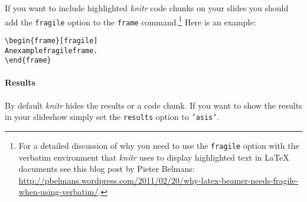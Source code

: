 \noindent If you want to include highlighted {\emph{knitr}} code chunks on your slides you should add the \texttt{fragile} option to the \texttt{frame} command.\footnote{For a detailed discussion of why you need to use the \texttt{fragile} option with the verbatim environment that {\emph{knitr}} uses to display highlighted text in LaTeX documents see this blog post by Pieter Belmans: \url{http://pbelmans.wordpress.com/2011/02/20/why-latex-beamer-needs-fragile-when-using-verbatim/}.} Here is an example:

\begin{knitrout}
\color{fgcolor}\begin{kframe}
\begin{alltt}
\textbackslash{}begin\{frame\}[fragile]
    An example fragile frame.
\textbackslash{}end\{frame\}
\end{alltt}
\end{kframe}
\end{knitrout}


\paragraph{Results}

By default {\emph{knitr}} hides the results or a code chunk. If you want to show the results in your slideshow simply set the {\tt{results}} option to {\tt{'asis'}}.
